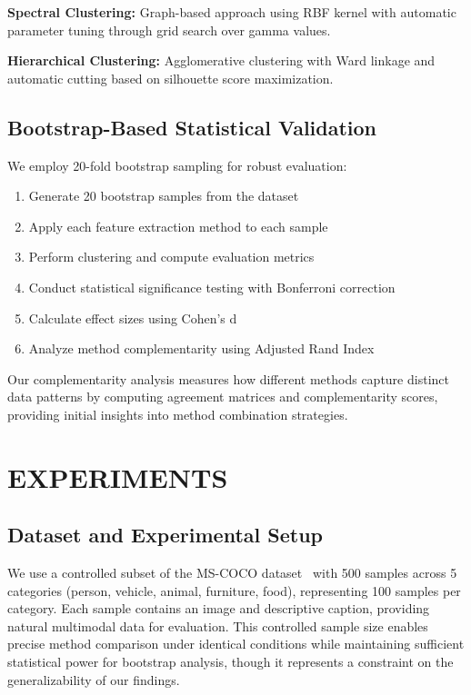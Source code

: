 \documentclass[sigconf]{acmart}
\begin{document}
\textbf{Spectral Clustering:} Graph-based approach using RBF kernel with automatic parameter tuning through grid search over gamma values.

\textbf{Hierarchical Clustering:} Agglomerative clustering with Ward linkage and automatic cutting based on silhouette score maximization.

\subsection{Bootstrap-Based Statistical Validation}

We employ 20-fold bootstrap sampling for robust evaluation:
\begin{enumerate}
\item Generate 20 bootstrap samples from the dataset
\item Apply each feature extraction method to each sample
\item Perform clustering and compute evaluation metrics
\item Conduct statistical significance testing with Bonferroni correction
\item Calculate effect sizes using Cohen's d
\item Analyze method complementarity using Adjusted Rand Index
\end{enumerate}

Our complementarity analysis measures how different methods capture distinct data patterns by computing agreement matrices and complementarity scores, providing initial insights into method combination strategies.

\section{EXPERIMENTS}

\subsection{Dataset and Experimental Setup}

We use a controlled subset of the MS-COCO dataset~\cite{lin2014microsoft} with 500 samples across 5 categories (person, vehicle, animal, furniture, food), representing 100 samples per category. Each sample contains an image and descriptive caption, providing natural multimodal data for evaluation. This controlled sample size enables precise method comparison under identical conditions while maintaining sufficient statistical power for bootstrap analysis, though it represents a constraint on the generalizability of our findings.
\end{document}
